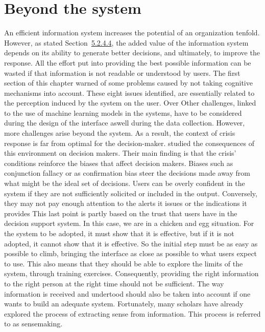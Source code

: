 \section{Beyond the system}
An efficient information system increases the potential of an organization tenfold.
However, as stated Section~\hyperref[sec:information-distribution]{5.2.4.4}, the added value of the information system depends on its ability to generate better decisions, and ultimately, to improve the response.
All the effort put into providing the best possible information can be wasted if that information is not readable or understood by users.
The first section of this chapter warned of some problems caused by not taking cognitive mechanisms into account.
These eight issues identified, are essentially related to the perception induced by the system on the user.
Over
Other challenges, linked to the use of machine learning models in the systems, have to be considered during the design of the interface aswell during the data collection.
However, more challenges arise beyond the system.
As a result, the context of crisis response is far from optimal for the decision-maker.
\textcite{comesCognitiveBiasesHumanitarian2016} studied the consequences of this environment on decision makers.
Their main finding is that the crisis' conditions reinforce the biases that affect decision makers.
Biases such as conjunction fallacy or as confirmation bias steer the decisions made away from what might be the ideal set of decisions.
Users can be overly confident in the system if they are not sufficiently solicited or included in the output.
Conversely, they may not pay enough attention to the alerts it issues or the indications it provides
This last point is partly based on the trust that users have in the decision support system.
In this case, we are in a chicken and egg situation.
For the system to be adopted, it must show that it is effective, but if it is not adopted, it cannot show that it is effective.
So the initial step must be as easy as possible to climb, bringing the interface as close as possible to what users expect to use.
This also means that they should be able to explore the limits of the system, through training exercises.
Consequently, providing the right information to the right person at the right time should not be sufficient.
The way information is received and undertood should also be taken into account if one wants to build an adequate system.
Fortunately, many scholars have already explored the process of extracting sense from information.
This process is referred to as sensemaking.
